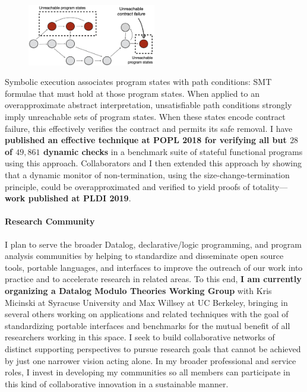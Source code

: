 \documentclass[12pt]{article}
\begin{document}
\begin{figure}
  \vspace{-0.50cm}
  \includegraphics[width=0.5\textwidth]{ContractVerification.png}
  \vspace{-0.25cm}
  \label{fig:bpra}
  \vspace{-0.45cm}
\end{figure}
%
Symbolic execution associates program states with path conditions: SMT formulae that must hold at those program states. When applied to an overapproximate abstract interpretation, unsatisfiable path conditions strongly imply unreachable sets of program states. When these states encode contract failure, this effectively verifies the contract and permits its safe removal. I have \textbf{published an effective technique at POPL 2018 for verifying all but $28$ of $49,\!861$ dynamic checks} in a benchmark suite of stateful functional programs using this approach.
Collaborators and I then extended this approach by showing that a dynamic monitor of non-termination, using the size-change-termination principle, could be overapproximated and verified to yield proofs of totality---\textbf{work published at PLDI 2019}.    


\paragraph{Research Community}

I plan to serve the broader Datalog, declarative/logic programming, and program analysis communities by helping to standardize and disseminate open source tools, portable languages, and interfaces to improve the outreach of our work into practice and to accelerate research in related areas. To this end, \textbf{I am currently organizing a Datalog Modulo Theories Working Group} with Kris Micinski at Syracuse University and Max Willsey at UC Berkeley, bringing in several others working on applications and related techniques with the goal of standardizing portable interfaces and benchmarks for the mutual benefit of all researchers working in this space.
I seek to build collaborative networks of distinct supporting perspectives to pursue research goals that cannot be achieved by just one narrower vision acting alone. In my broader professional and service roles, I invest in developing my communities so all members can participate in this kind of collaborative innovation in a sustainable manner.  
\end{document}
